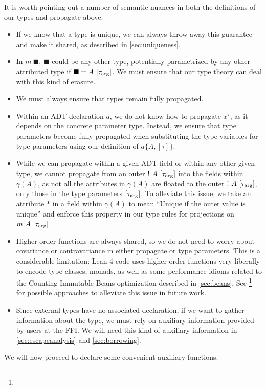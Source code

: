 It is worth pointing out a number of semantic nuances in both the definitions of our types and propagate above:
\begin{itemize}
	\item If we know that a type is unique, we can always throw away this guarantee and make it shared, as described in \cref{sec:uniqueness}.
	\item In $m\ \blacksquare$, $\blacksquare$ could be any other type, potentially parametrized by any other attributed type if $\blacksquare = A\ [\tau_\arrg]$. We must ensure that our type theory can deal with this kind of erasure.
	\item We must always ensure that types remain fully propagated.
	\item Within an ADT declaration $a$, we do not know how to propagate $x^\tau$, as it depends on the concrete parameter type. Instead, we ensure that type parameters become fully propagated when substituting the type variables for type parameters using our definition of $a\{A, [\tau]\}$.
	\item While we can propagate within a given ADT field or within any other given type, we cannot propagate from an outer $!\ A\ [\tau_\arrg]$ into the fields within $\gamma(A)$, as not all the attributes in $\gamma(A)$ are floated to the outer $!\ A\ [\tau_\arrg]$, only those in the type parameters $[\tau_{\mathrm{arg}}]$. To alleviate this issue, we take an attribute $*$ in a field within $\gamma(A)$ to mean ``Unique if the outer value is unique'' and enforce this property in our type rules for projections on $m\ A\ [\tau_\arrg]$.
	\item Higher-order functions are always shared, so we do not need to worry about covariance or contravariance in either propagate or type parameters. This is a considerable limitation: Lean 4 code uses higher-order functions very liberally to encode type classes, monads, as well as some performance idioms related to the Counting Immutable Beans optimization described in \cref{sec:beans}. See \footnote{} for possible approaches to alleviate this issue in future work.
	\item Since external types have no associated declaration, if we want to gather information about the type, we must rely on auxiliary information provided by users at the FFI. We will need this kind of auxiliary information in \cref{sec:escapeanalysis} and \cref{sec:borrowing}.
\end{itemize}

We will now proceed to declare some convenient auxiliary functions. 

